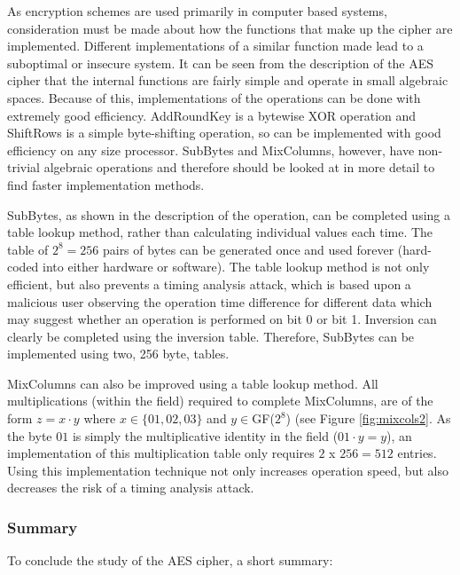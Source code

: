 \documentclass[a4paper,12pt]{report}
\begin{document}

As encryption schemes are used primarily in computer based systems, consideration must be made about how the functions that make up the cipher are implemented. Different implementations of a similar function made lead to a suboptimal or insecure system. It can be seen from the description of the AES cipher that the internal functions are fairly simple and operate in small algebraic spaces. Because of this, implementations of the operations can be done with extremely good efficiency. AddRoundKey is a bytewise XOR operation and ShiftRows is a simple byte-shifting operation, so can be implemented with good efficiency on any size processor. SubBytes and MixColumns, however, have non-trivial algebraic operations and therefore should be looked at in more detail to find faster implementation methods. 

SubBytes, as shown in the description of the operation, can be completed using a table lookup method, rather than calculating individual values each time. The table of $2^{8} = 256$ pairs of bytes can be generated once and used forever (hard-coded into either hardware or software). The table lookup method is not only efficient, but also prevents a timing analysis attack, which is based upon a malicious user observing the operation time difference for different data which may suggest whether an operation is performed on bit 0 or bit 1. Inversion can clearly be completed using the inversion table. Therefore, SubBytes can be implemented using two, 256 byte, tables. 

MixColumns can also be improved using a table lookup method. All multiplications (within the field) required to complete MixColumns, are of the form $z = x \cdotp y$ where $x \in \{01,02,03\}$ and $y \in $GF($2^{8}$) (see Figure \ref{fig:mixcols2}. As the byte $01$ is simply the multiplicative identity in the field ($01 \cdotp y = y$), an implementation of this multiplication table only requires $2$ x $256 = 512$ entries. Using this implementation technique not only increases operation speed, but also decreases the risk of a timing analysis attack. 

\subsubsection{Summary}

To conclude the study of the AES cipher, a short summary:
\end{document}
